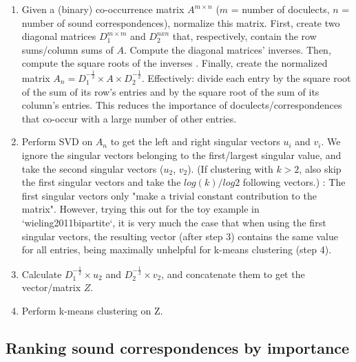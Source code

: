 \documentclass[a4paper]{article}
\begin{document}
\begin{enumerate}
\item 
Given a (binary) co-occurrence matrix $A^{m \times n}$ ($m$ = number of doculects, $n$ = number of sound correspondences), normalize this matrix.
First, create two diagonal matrices $D_1^{m \times m}$ and $D_2^{n x n}$ that, respectively, contain the row sums/column sums of $A$.
Compute the diagonal matrices' inverses. 
Then, compute the square roots of the inverses
.
Finally, create the normalized matrix $A_n = D_1^{-\frac{1}{2}} \times A \times D_2^{-\frac{1}{2}}$.
Effectively: divide each entry by the square root of the sum of its row's entries and by the square root of the sum of its column's entries.
This reduces the importance of doculects/correspondences that co-occur with a large number of other entries.

\item
Perform SVD on $A_n$ to get the left and right singular vectors $u_i$ and $v_i$.
We ignore the singular vectors belonging to the first/largest singular value, and take the second singular vectors ($u_2$, $v_2$).
(If clustering with $k > 2$, also skip the first singular vectors and take the $log(k)/log2$ following vectors.)
\citet{kluger2003spectral}: The first singular vectors only "make a trivial constant contribution to the matrix".
However, trying this out for the toy example in `wieling2011bipartite`, it is very much the case that when using the first singular vectors, the resulting vector (after step 3) contains the same value for all entries, being maximally unhelpful for k-means clustering (step 4).

\item
Calculate $D_1^{-\frac{1}{2}} \times u_2$ and $D_2^{-\frac{1}{2}} \times v_2$, and concatenate them to get the vector/matrix $Z$. 

\item
Perform k-means clustering on Z.

\end{enumerate}


\subsection{Ranking sound correspondences by importance}
\end{document}
